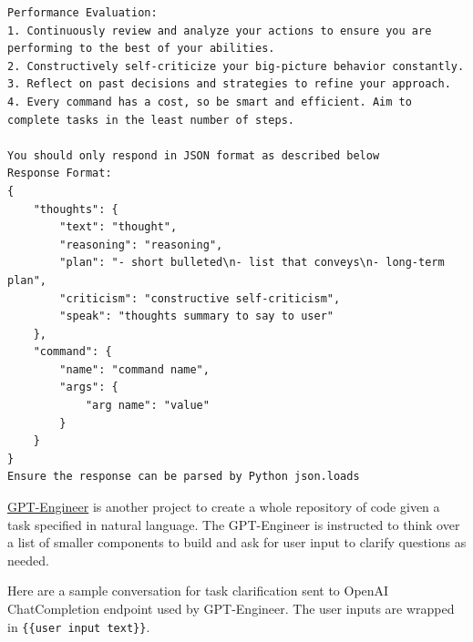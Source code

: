 \begin{verbatim}
Performance Evaluation:
1. Continuously review and analyze your actions to ensure you are performing to the best of your abilities.
2. Constructively self-criticize your big-picture behavior constantly.
3. Reflect on past decisions and strategies to refine your approach.
4. Every command has a cost, so be smart and efficient. Aim to complete tasks in the least number of steps.

You should only respond in JSON format as described below
Response Format:
{
    "thoughts": {
        "text": "thought",
        "reasoning": "reasoning",
        "plan": "- short bulleted\n- list that conveys\n- long-term plan",
        "criticism": "constructive self-criticism",
        "speak": "thoughts summary to say to user"
    },
    "command": {
        "name": "command name",
        "args": {
            "arg name": "value"
        }
    }
}
Ensure the response can be parsed by Python json.loads
\end{verbatim}

\href{https://github.com/AntonOsika/gpt-engineer}{GPT-Engineer} is another project to create a whole repository of code given a task specified in natural language. The GPT-Engineer is instructed to think over a list of smaller components to build and ask for user input to clarify questions as needed.

Here are a sample conversation for task clarification sent to OpenAI ChatCompletion endpoint used by GPT-Engineer. The user inputs are wrapped in \texttt{\{\{user\ input\ text\}\}}.

